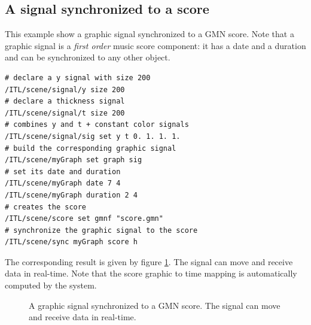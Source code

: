 \documentclass{article}
\begin{document}
{{\subsection{A signal synchronized to a score}

This example show a graphic signal synchronized to a GMN score. Note that a graphic signal is  a \emph{first order} music score component: it has a date and a duration and can be synchronized to any other object. 
{\small \begin{verbatim}
# declare a y signal with size 200
/ITL/scene/signal/y size 200 
# declare a thickness signal
/ITL/scene/signal/t size 200
# combines y and t + constant color signals
/ITL/scene/signal/sig set y t 0. 1. 1. 1.
# build the corresponding graphic signal
/ITL/scene/myGraph set graph sig
# set its date and duration
/ITL/scene/myGraph date 7 4
/ITL/scene/myGraph duration 2 4
# creates the score
/ITL/scene/score set gmnf "score.gmn"
# synchronize the graphic signal to the score
/ITL/scene/sync myGraph score h
\end{verbatim}

The corresponding result is given by figure \ref{fig:graph}. The signal can move and receive data in real-time. Note that the score graphic to time mapping is automatically computed by the system.

\begin{figure}[htbp]
\centerline{}
\caption{A graphic signal synchronized to a GMN score. The signal can move and receive data in real-time.}
\label{fig:graph}
\end{figure}


}}}
\end{document}
